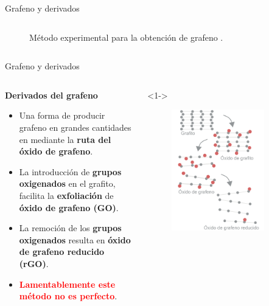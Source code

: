 \documentclass[aspectratio=169]{beamer}
\begin{document}
\begin{frame}{Grafeno y derivados}
\begin{columns}
\begin{column}{0.4\textwidth}
\begin{onlyenv}
\begin{figure}
						\caption{Método experimental para la obtención de grafeno \citep{Novoselov2004}.}
					\end{figure}
				\end{onlyenv}
			\end{column}
		\end{columns}
	\end{frame}

	\begin{frame}{Grafeno y derivados}
		\begin{columns}
			\begin{column}{0.6\textwidth}
				\only<1->\textbf{Derivados del grafeno}
				\begin{itemize}[<+(1)->]
					\item Una forma de producir grafeno en grandes cantidades en mediante la \textbf{ruta del óxido de grafeno}.
					\item La introducción de \textcolor{red_oxigen}{\textbf{grupos oxigenados}} en el grafito, facilita la \textbf{exfoliación} de \textbf{óxido de grafeno (GO)}.
					\item La remoción de los \textcolor{red_oxigen}{\textbf{grupos oxigenados}} resulta en \textbf{óxido de grafeno reducido (rGO)}.
					\item[] \textcolor{red}{\textbf{Lamentablemente este método no es perfecto}}.
				\end{itemize}
			\end{column}
			\begin{column}{0.4\textwidth}
				\begin{onlyenv}<1->
					\begin{figure}
						\includegraphics[width=0.8\textwidth]{graphiteTORGO_stack.pdf}

\end{figure}
\end{onlyenv}
\end{column}
\end{columns}
\end{frame}
\end{document}
